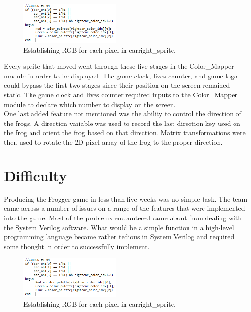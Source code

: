\documentclass[journal, twocolumn, final,11pt,letterpaper]{IEEEtran}
\begin{document}
	\begin{figure}[H]
		\centering
		\includegraphics[width=0.45\textwidth]{sprite_description5.png}
		\caption{Establishing RGB for each pixel in carright\_sprite.}
		\label{fig:sprite_description5}
	\end{figure}	
	
Every sprite that moved went through these five stages in the  Color\_Mapper module in order to be displayed.  The game clock, lives counter, and game logo could bypass the first two stages since their position on the screen remained static.  The game clock and lives counter required inputs to the Color\_Mapper module to declare which number to display on the screen. \\

One last added feature not mentioned was the ability to control the direction of the frogs.  A direction variable was used to record the last direction key used on the frog and orient the frog based on that direction.  Matrix transformations were then used to rotate the 2D pixel array of the frog to the proper direction.  \\  	
	
\section{ Difficulty}
Producing the Frogger game in less than five weeks was no simple task.  The team came across a number of issues on a range of the features that were implemented into the game.  Most of the problems encountered came about from dealing with the System Verilog software.  What would be a simple function in a high-level programming language became rather tedious in System Verilog and required some thought in order to successfully implement.  \\


	\begin{figure}[H]
		\centering
		\includegraphics[width=0.45\textwidth]{sprite_description5.png}
		\caption{Establishing RGB for each pixel in carright\_sprite.}
		\label{fig:sprite_description5}
	\end{figure}	
	
\end{document}
